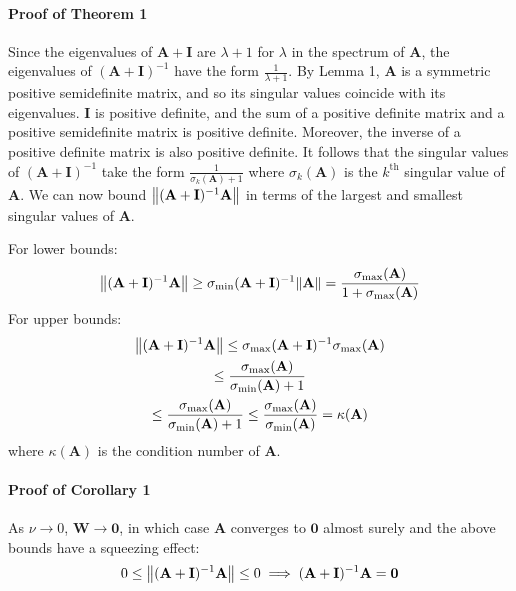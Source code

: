 \documentclass[mnsc,blindrev]{informs3}
\begin{document}
        \paragraph{Proof of Theorem 1}
            Since the eigenvalues of $\mathbf{A} + \mathbf{I}$ are $\lambda + 1$ for $\lambda$ in the spectrum of $\mathbf{A}$, the eigenvalues of $(\mathbf{A} + \mathbf{I})^{-1}$ have the form $\frac{1}{\lambda + 1}$. By Lemma 1, $\mathbf{A}$ is a symmetric positive semidefinite matrix, and so its singular values coincide with its eigenvalues. $\mathbf{I}$ is positive definite, and the sum of a positive definite matrix and a positive semidefinite matrix is positive definite. Moreover, the inverse of a positive definite matrix is also positive definite.  It follows that the singular values of $(\mathbf{A} + \mathbf{I})^{-1}$ take the form $\frac{1}{\sigma_k(\mathbf{A}) + 1}$ where $\sigma_k(\mathbf{A})$ is the $k^{\text{th}}$ singular value of $\mathbf{A}$. We can now bound $\norm{(\mathbf{A} + \mathbf{I})^{-1}\mathbf{A}}$ in terms of the largest and smallest singular values of $\mathbf{A}$. 
    
            For lower bounds:
            \begin{gather*}
                \norm{(\mathbf{A} + \mathbf{I})^{-1}\mathbf{A}} \geq \sigma_{\min}{(\mathbf{A} + \mathbf{I})^{-1}} \norm{\mathbf{A}} 
                = \frac{\sigma_{\max}(\mathbf{A})}{1 + \sigma_{\max}(\mathbf{A})} %
            \end{gather*}
            For upper bounds:
            \begin{gather*}
                \norm{(\mathbf{A} + \mathbf{I})^{-1}\mathbf{A}} \leq \sigma_{\max}{(\mathbf{A} + \mathbf{I})^{-1}} \sigma_{\max}(\mathbf{A}) \\
                \leq \frac{\sigma_{\max}(\mathbf{A})}{\sigma_{\min}(\mathbf{A})+1} \\
                \leq \frac{\sigma_{\max}(\mathbf{A})}{\sigma_{\min}(\mathbf{A})+1}
                \leq \frac{\sigma_{\max}(\mathbf{A})}{\sigma_{\min}(\mathbf{A})} = \kappa(\mathbf{A})
            \end{gather*}
            where $\kappa(\mathbf{A})$ is the condition number of $\mathbf{A}$. 
    
        \paragraph{Proof of Corollary 1}
            As $\nu \rightarrow 0$, $\mathbf{W} \rightarrow \mathbf{0}$, in which case $\mathbf{A}$ converges to $\mathbf{0}$ almost surely and the above bounds have a squeezing effect:
            \begin{equation*}
                0 \leq \norm{(\mathbf{A} + \mathbf{I})^{-1}\mathbf{A}} \leq 0 \implies (\mathbf{A} + \mathbf{I})^{-1}\mathbf{A} = \mathbf{0}
            \end{equation*}
    
\end{document}
